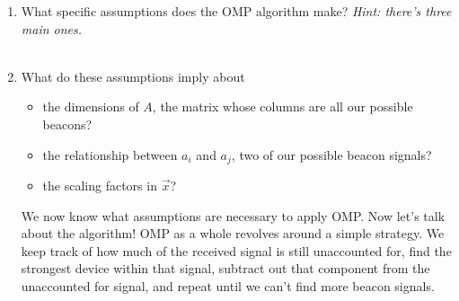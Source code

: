 \begin{enumerate}
    \item What specific assumptions does the OMP algorithm make? \textit{
        Hint: there's three main ones.
    }
    \answerbox{2cm}
    \\ \\
    \item What do these assumptions imply about
    \begin{itemize}
        \item the dimensions of $A$, the matrix whose columns are all our possible beacons?
        \answerbox{0.5cm}
        \item the relationship between $a_i$ and $a_j$, two of our possible beacon signals?
        \answerbox{0.5cm}
        \item the scaling factors in $\vec{x}$?
        \answerbox{0.5cm}
    \end{itemize}

    We now know what assumptions are necessary to apply OMP. Now let's talk about the algorithm!
    OMP as a whole revolves around a simple strategy. We keep track of how much of the received signal is
    still unaccounted for, find the strongest device within that signal, subtract out that component from
    the unaccounted for signal, and repeat until we can't find more beacon signals.
    \\ \\

\end{enumerate}